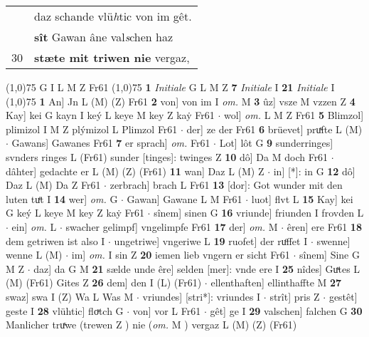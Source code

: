 \documentclass[8pt,a4paper,notitlepage]{article}
\begin{document}
\begin{table}[ht]
\begin{minipage}[t]{0.5\linewidth}
\begin{tabular}{rl}
 & daz schande vlü\textit{h}tic von im gêt.\\ 
 & \textbf{sît} Gawan âne val\textit{s}chen haz\\ 
30 & \textbf{stæte mit triwen nie} vergaz,\\ 
\end{tabular}
\scriptsize
\line(1,0){75} \newline
G I L M Z Fr61 \newline
\line(1,0){75} \newline
\textbf{1} \textit{Initiale} G L M Z  \textbf{7} \textit{Initiale} I  \textbf{21} \textit{Initiale} I  \newline
\line(1,0){75} \newline
\textbf{1} An] Jn L (M) (Z) Fr61 \textbf{2} von] von im I \textit{om.} M \textbf{3} ûz] vsze M vzzen Z \textbf{4} Kay] kei G kayn I keý L keye M key Z kaẏ Fr61  $\cdot$ wol] \textit{om.} L M Z Fr61 \textbf{5} Blimzol] plimizol I M Z plýmizol L Plimzol Fr61  $\cdot$ der] ze der Fr61 \textbf{6} brüevet] pruͯfte L (M)  $\cdot$ Gawans] Gawanes Fr61 \textbf{7} er sprach] \textit{om.} Fr61  $\cdot$ Lot] lôt G \textbf{9} sunderringes] svnders ringes L (Fr61) sunder [tinges]: twinges  Z \textbf{10} dô] Da M doch Fr61  $\cdot$ dâhter] gedachte er L (M) (Z) (Fr61) \textbf{11} wan] Daz L (M) Z  $\cdot$ in] [*]: in G \textbf{12} dô] Daz L (M) Da Z Fr61  $\cdot$ zerbrach] brach L Fr61 \textbf{13} [dor]: Got wunder mit den luten tuͤt I \textbf{14} wer] \textit{om.} G  $\cdot$ Gawan] Gawane L M Fr61  $\cdot$ luot] flvt L \textbf{15} Kay] kei G keý L keye M key Z kaẏ Fr61  $\cdot$ sînem] sinen G \textbf{16} vriunde] friunden I frovden L  $\cdot$ ein] \textit{om.} L  $\cdot$ swacher gelimpf] vngelimpfe Fr61 \textbf{17} der] \textit{om.} M  $\cdot$ êren] ere Fr61 \textbf{18} dem getriwen ist also I  $\cdot$ ungetriwe] vngeriwe L \textbf{19} ruofet] der ruͦffet I  $\cdot$ swenne] wenne L (M)  $\cdot$ im] \textit{om.} I sin Z \textbf{20} iemen lieb vngern er sicht Fr61  $\cdot$ sînem] Sine G M Z  $\cdot$ daz] da G M \textbf{21} sælde unde êre] selden [mer]: vnde ere I \textbf{25} nîdes] Guͯtes L (M) (Fr61) Gites Z \textbf{26} dem] den I (L) (Fr61)  $\cdot$ ellenthaften] ellinthaffte M \textbf{27} swaz] swa I (Z) Wa L Was M  $\cdot$ vriundes] [stri*]: vriundes I  $\cdot$ strît] pris Z  $\cdot$ gestêt] geste I \textbf{28} vlühtic] floͮtch G  $\cdot$ von] vor L Fr61  $\cdot$ gêt] ge I \textbf{29} valschen] falchen G \textbf{30} Manlicher truͯwe (trewen Z ) nie (\textit{om.} M ) vergaz L (M) (Z) (Fr61) \newline
\end{minipage}

\end{table}
\end{document}
